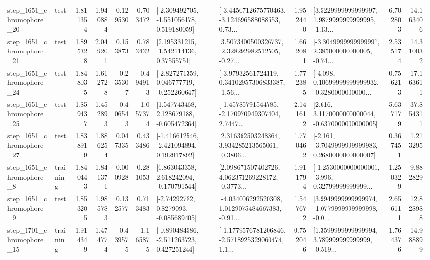 \begin{tabular}{llrrrrllrlrr}
 step\_1651\_chromophore\_20 &      test &      1.811354 &    1.940884 &      0.129530 &  0.703472 &   [-2.309492705, -1.551056178, 0.519180059] &  [-3.4450712675770463, -3.124696588088553, 0.73... &       1.952440 &  [3.5229999999999997, 1.9879999999999995, -1.13... &            6.702803 &         14.163406 \\
 step\_1651\_chromophore\_21 &      test &      1.895328 &    2.049201 &      0.153873 &  0.783432 &     [2.195331215, -1.542114136, 0.37555751] &  [3.5073400500326737, -2.328292982512505, -0.27... &       1.662081 &  [-3.3049999999999997, 2.385000000000005, -0.74... &            2.535174 &         14.310032 \\
 step\_1651\_chromophore\_24 &      test &      1.848035 &    1.612728 &     -0.235307 & -0.494913 &   [-2.827271359, 0.046777719, -0.252260647] &  [-3.97932561724119, 0.34102957306833387, -1.56... &       1.772385 &  [-4.098, 0.10699999999999932, -0.3280000000000... &            0.756213 &         17.163611 \\
 step\_1651\_chromophore\_25 &      test &      1.859437 &    1.452893 &     -0.406543 & -1.057374 &    [1.547743468, 2.128679188, -0.605472364] &  [-1.45785791544785, -2.170970949307404, 2.7447... &       2.141612 &   [2.616, 3.1170000000000044, -0.6370000000000005] &            5.637179 &         37.854311 \\
 step\_1651\_chromophore\_27 &      test &      1.838919 &    1.886254 &      0.047335 &  0.433486 &   [-1.416612546, -2.421094894, 0.192917892] &  [2.316362503248364, 3.934285213565061, -0.3806... &       1.770462 &  [-2.161, -3.7049999999999983, 0.2680000000000007] &            0.367451 &          1.213295 \\
  step\_1651\_chromophore\_8 &  training &      1.840443 &    1.841371 &      0.000928 &  0.281053 &    [0.863043358, 2.618242094, -0.170791544] &  [2.098671507402726, 4.062371269228172, -0.3773... &       1.911794 &  [-1.2530000000000001, -3.996, 0.32799999999999... &            1.250329 &          9.882829 \\
  step\_1651\_chromophore\_9 &      test &      1.853205 &    1.985783 &      0.132577 &  0.713483 &      [-2.74292782, 0.8279093, -0.085689405] &  [-4.034006292520308, 1.0129075484667383, -0.91... &       1.547672 &  [3.9949999999999974, -1.0779999999999998, -0.0... &            2.656111 &         12.828988 \\
 step\_1701\_chromophore\_15 &  training &      1.914349 &    1.474774 &     -0.439575 & -1.165875 &   [-0.890484586, -2.511263723, 0.427251244] &  [-1.1779576781206846, -2.5718925329060474, 1.1... &       0.752046 &  [1.3599999999999994, 3.789999999999999, -0.519... &            1.764376 &         14.988899 \\

\end{tabular}
